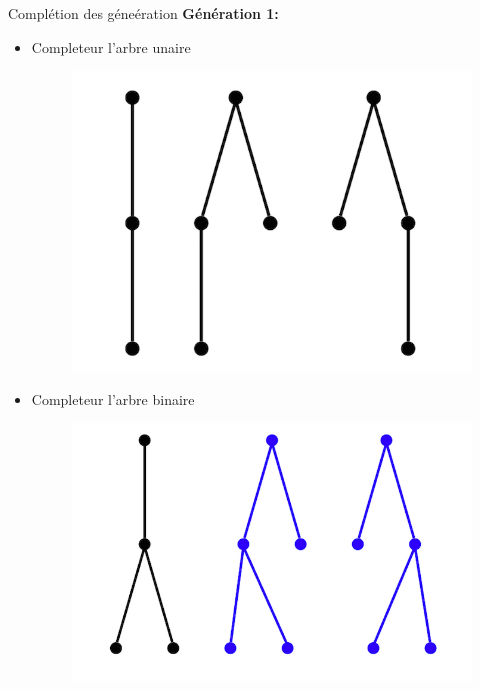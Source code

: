 \documentclass{beamer}
\begin{document}
\begin{frame}{Complétion des géneération}
\textbf{Génération 1:}\\
\begin{itemize}
\item  Completeur l'arbre unaire
\begin{figure}[h]
  \centering
  \includegraphics[scale=0.17]{gen1-1.png}
\end{figure}
\item Completeur l'arbre binaire
\begin{figure}[h]
  \centering
  \includegraphics[scale=0.17]{gen1-2.png}
\end{figure}
\end{itemize}
\end{frame}
\end{document}
